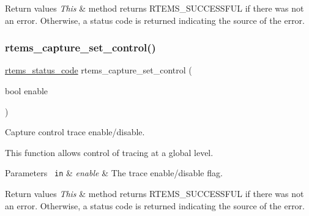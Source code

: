 \begin{DoxyRetVals}{Return values}
{\em This} & method returns R\+T\+E\+M\+S\+\_\+\+S\+U\+C\+C\+E\+S\+S\+F\+UL if there was not an error. Otherwise, a status code is returned indicating the source of the error. \\
\hline
\end{DoxyRetVals}
\mbox{\label{group__libmisc__capture_ga93fda7c6a8537647f1236d2914f3fc98}} 
\subsubsection{\texorpdfstring{rtems\_capture\_set\_control()}{rtems\_capture\_set\_control()}}
{\footnotesize\ttfamily \mbox{\hyperlink{group__ClassicStatus_ga545d41846817eaba6143d52ee4d9e9fe}{rtems\+\_\+status\+\_\+code}} rtems\+\_\+capture\+\_\+set\+\_\+control (\begin{DoxyParamCaption}\item[{bool}]{enable }\end{DoxyParamCaption})}



Capture control trace enable/disable. 

This function allows control of tracing at a global level.


\begin{DoxyParams}[1]{Parameters}
\mbox{\texttt{ in}}  & {\em enable} & The trace enable/disable flag.\\
\hline
\end{DoxyParams}

\begin{DoxyRetVals}{Return values}
{\em This} & method returns R\+T\+E\+M\+S\+\_\+\+S\+U\+C\+C\+E\+S\+S\+F\+UL if there was not an error. Otherwise, a status code is returned indicating the source of the error. \\
\hline
\end{DoxyRetVals}
\mbox{\label{group__libmisc__capture_ga11c38aa44af23dfe0e8b1cd88c01eebd}} 
